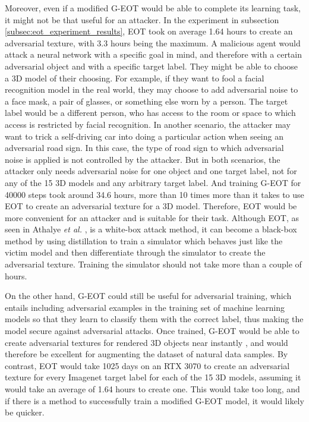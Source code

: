 Moreover, even if a modified G-EOT would be able to complete its learning task, it might not be that useful for an attacker. In the experiment in subsection \ref{subsec:eot_experiment_results}, EOT took on average 1.64 hours to create an adversarial texture, with 3.3 hours being the maximum. A malicious agent would attack a neural network with a specific goal in mind, and therefore with a certain adversarial object and with a specific target label. They might be able to choose a 3D model of their choosing. For example, if they want to fool a facial recognition model in the real world, they may choose to add adversarial noise to a face mask, a pair of glasses, or something else worn by a person. The target label would be a different person, who has access to the room or space to which access is restricted by facial recognition. In another scenario, the attacker may want to trick a self-driving car into doing a particular action when seeing an adversarial road sign. In this case, the type of road sign to which adversarial noise is applied is not controlled by the attacker. But in both scenarios, the attacker only needs adversarial noise for one object and one target label, not for any of the 15 3D models and any arbitrary target label. And training G-EOT for 40000 steps took around 34.6 hours, more than 10 times more than it takes to use EOT to create an adversarial texture for a 3D model. Therefore, EOT would be more convenient for an attacker and is suitable for their task. Although EOT, as seen in Athalye \textit{et al.} \cite{athalye}, is a white-box attack method, it can become a black-box method by using distillation \cite{distillation} to train a simulator which behaves just like the victim model and then differentiate through the simulator to create the adversarial texture. Training the simulator should not take more than a couple of hours.

On the other hand, G-EOT could still be useful for adversarial training, which entails including adversarial examples in the training set of machine learning models so that they learn to classify them with the correct label, thus making the model secure against adversarial attacks. Once trained, G-EOT would be able to create adversarial textures for rendered 3D objects near instantly \cite{advGAN}, and would therefore be excellent for augmenting the dataset of natural data samples. By contrast, EOT would take 1025 days on an RTX 3070 to create an adversarial texture for every Imagenet target label for each of the 15 3D models, assuming it would take an average of 1.64 hours to create one. This would take too long, and if there is a method to successfully train a modified G-EOT model, it would likely be quicker.
